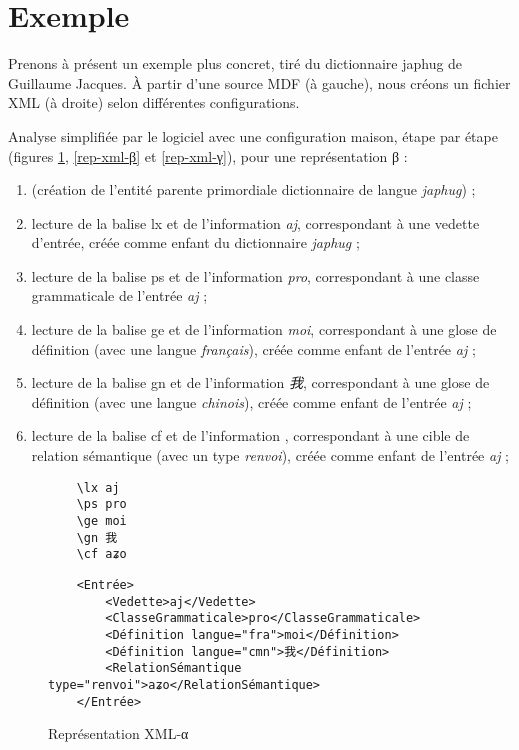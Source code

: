 \documentclass[10pt]{report}
\newcommand{\balise}[1]{\textcolor{red!80}{#1}}
\newcommand{\entité}[1]{\textcolor{blue!60!black}{#1}}
\newcommand{\caractéristique}[1]{\textcolor{green!60!black}{#1}}
\newcommand{\entitétechnique}[1]{\textcolor{blue!50!red}{#1}}
\begin{document}
\section{Exemple}

Prenons à présent un exemple plus concret, tiré du dictionnaire japhug de Guillaume Jacques. À partir d’une source MDF (à gauche), nous créons un fichier XML (à droite) selon différentes configurations.

Analyse simplifiée par le logiciel avec une configuration maison, étape par étape (figures \ref{rep-xml-α}, \ref{rep-xml-β} et \ref{rep-xml-γ}), pour une représentation β :

\begin{enumerate}
	\item (création de l’entité parente primordiale \entité{dictionnaire} de \caractéristique{langue} \textit{japhug}) ;
	\item lecture de la balise \balise{lx} et de l’information \textit{aj}, correspondant à une \caractéristique{vedette} d’\entité{entrée}, créée comme enfant du \entité{dictionnaire} \textit{japhug} ;
	\item lecture de la balise \balise{ps} et de l’information \textit{pro}, correspondant à une \caractéristique{classe grammaticale} de l’\entité{entrée} \textit{aj} ;
	\item lecture de la balise \balise{ge} et de l’information \textit{moi}, correspondant à une \caractéristique{glose} de \entité{définition} (avec une \caractéristique{langue} \textit{français}), créée comme enfant de l’\entité{entrée} \textit{aj} ;
	\item lecture de la balise \balise{gn} et de l’information \textit{我}, correspondant à une \caractéristique{glose} de \entité{définition} (avec une \caractéristique{langue} \textit{chinois}), créée comme enfant de l’\entité{entrée} \textit{aj} ;
	\item lecture de la balise \balise{cf} et de l’information \textit{}, correspondant à une \caractéristique{cible} de \entité{relation sémantique} (avec un \caractéristique{type} \textit{renvoi}), créée comme enfant de l’\entité{entrée} \textit{aj} ;
\end{enumerate}

\begin{figure}[H]
	\centering
	\begin{minipage}{0.2\linewidth}
    \begin{verbatim}
    \lx aj
    \ps pro
    \ge moi
    \gn 我
    \cf aʑo
    \end{verbatim}
	\end{minipage}%
	\begin{minipage}{0.8\linewidth}
    \begin{verbatim}
    <Entrée>
        <Vedette>aj</Vedette>
        <ClasseGrammaticale>pro</ClasseGrammaticale>
        <Définition langue="fra">moi</Définition>
        <Définition langue="cmn">我</Définition>
        <RelationSémantique type="renvoi">aʑo</RelationSémantique>
    </Entrée>
    \end{verbatim}	
	\end{minipage}
	\caption{Représentation XML-α}
	\label{rep-xml-α}
\end{figure}
\end{document}
